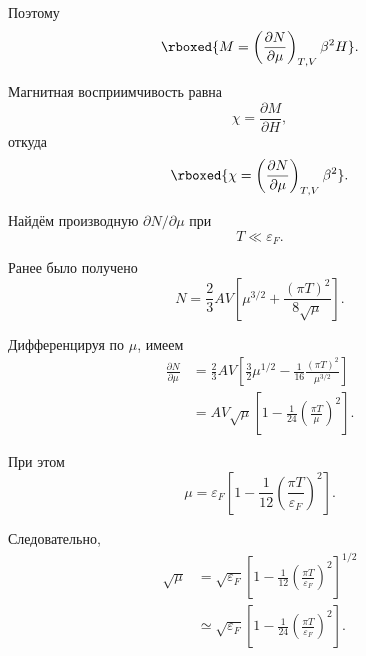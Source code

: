 \documentclass[../final.tex]{subfiles}
\begin{document}
Поэтому
%
\[
    \rboxed{
        M
        =
        \left(
            \frac{\partial N}{\partial\mu}
        \right)_{T,V}
        \beta^2H
    }.
\]

Магнитная восприимчивость равна
%
\begin{equation*}
    \chi
    =
    \frac{\partial M}{\partial H},
\end{equation*}
%
откуда
%
\[
    \rboxed{
        \chi
        =
        \left(
            \frac{\partial N}{\partial\mu}
        \right)_{T,V}
        \beta^2
    }.
\]

Найдём производную $\partial N/\partial\mu$ при
%
\begin{equation*}
    T
    \ll
    \varepsilon_F.
\end{equation*}

Ранее было получено
%
\begin{equation*}
    N
    =
    \frac{2}{3}AV
    \left[
        \mu^{3/2}
        +
        \frac{(\pi T)^2}{8\sqrt{\mu}}
    \right].
\end{equation*}

Дифференцируя по $\mu$, имеем
%
\begin{align*}
    \frac{\partial N}{\partial\mu}
    &=
    \frac{2}{3}AV
    \left[
        \frac{3}{2}\mu^{1/2}
        -
        \frac{1}{16}
        \frac{(\pi T)^2}{\mu^{3/2}}
    \right]
    \\[6pt]
    &=
    AV\sqrt{\mu}
    \left[
        1
        -
        \frac{1}{24}
        \left(
            \frac{\pi T}{\mu}
        \right)^2
    \right].
\end{align*}

При этом
%
\begin{equation*}
    \mu
    =
    \varepsilon_F
    \left[
        1
        -
        \frac{1}{12}
        \left(
            \frac{\pi T}{\varepsilon_F}
        \right)^2
    \right].
\end{equation*}

Следовательно,
%
\begin{align*}
    \sqrt{\mu}
    &=
    \sqrt{\varepsilon_F}
    \left[
        1
        -
        \frac{1}{12}
        \left(
            \frac{\pi T}{\varepsilon_F}
        \right)^2
    \right]^{1/2}
    \\[4pt]
    &\simeq
    \sqrt{\varepsilon_F}
    \left[
        1
        -
        \frac{1}{24}
        \left(
            \frac{\pi T}{\varepsilon_F}
        \right)^2
    \right].
\end{align*}
\end{document}
